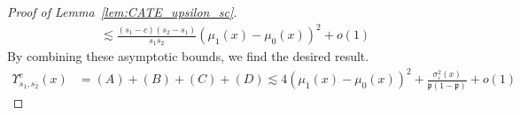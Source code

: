 \begin{proof}[Proof of Lemma~\ref{lem:CATE_upsilon_sc}]
\begin{equation}
\begin{aligned}
			& \lesssim  \frac{(s_1 - c)(s_2 - s_1)}{s_1 s_2} \left(\mu_1(x) - \mu_0(x)\right)^2 + o(1)
		\end{aligned}
	\end{equation}
	By combining these asymptotic bounds, we find the desired result.
	\begin{equation}
		\begin{aligned}
			\Upsilon_{s_1, s_2}^{c}\left(x\right)
			& = (A) + (B) + (C) + (D)
			\lesssim 4 \left(\mu_1(x) - \mu_0(x)\right)^2 + \frac{\sigma^2_{\varepsilon}(x)}{\mathfrak{p}(1 - \mathfrak{p})} + o(1)
		\end{aligned}
	\end{equation}
\end{proof}